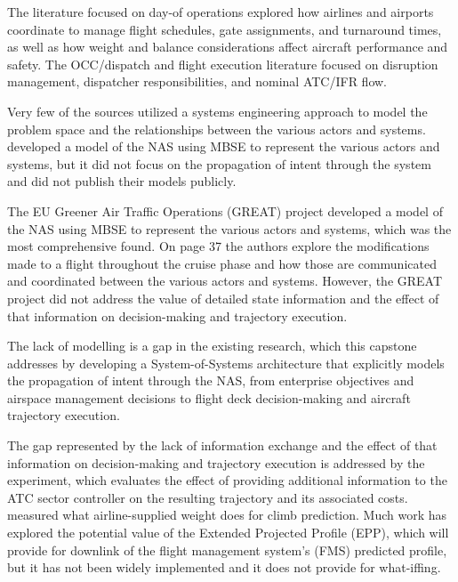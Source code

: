 The literature focused on day-of operations explored how airlines and airports coordinate to manage flight schedules, gate assignments, and turnaround times, as well as how weight and balance considerations affect aircraft performance and safety. The OCC/dispatch and flight execution literature focused on disruption management, dispatcher responsibilities, and nominal ATC/IFR flow.

Very few of the sources utilized a systems engineering approach to model the problem space and the relationships between the various actors and systems. \cite{liu2025mbseAtmSmt} developed a model of the NAS using MBSE to represent the various actors and systems, but it did not focus on the propagation of intent through the system and did not publish their models publicly. 

The EU Greener Air Traffic Operations (GREAT) project \cite{great2021d51avionicsArch} developed a model of the NAS using MBSE to represent the various actors and systems, which was the most comprehensive found. On page 37 the authors explore the modifications made to a flight throughout the cruise phase and how those are communicated and coordinated between the various actors and systems. However, the GREAT project did not address the value of detailed state information and the effect of that information on decision-making and trajectory execution.

 The lack of modelling is a gap in the existing research, which this capstone addresses by developing a System-of-Systems architecture that explicitly models the propagation of intent through the NAS, from enterprise objectives and airspace management decisions to flight deck decision-making and aircraft trajectory execution.

The gap represented by the lack of information exchange and the effect of that information on decision-making and trajectory execution is addressed by the experiment, which evaluates the effect of providing additional information to the ATC sector controller on the resulting trajectory and its associated costs. \cite{coppenbarger1999climbPrediction} measured what airline-supplied weight does for climb prediction. Much work has explored the potential value of the Extended Projected Profile (EPP), which will provide for downlink of the flight management system's (FMS) predicted profile, but it has not been widely implemented and it does not provide for what-iffing. 

